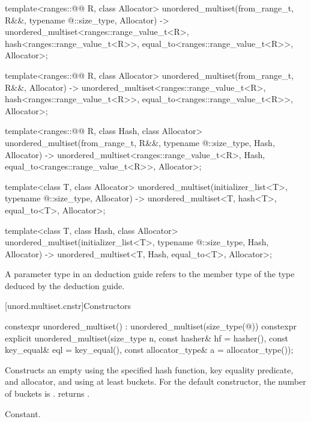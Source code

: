 \begin{codeblock}
{  template<ranges::@@ R, class Allocator>
    unordered_multiset(from_range_t, R&&, typename @\seebelow@::size_type, Allocator)
      -> unordered_multiset<ranges::range_value_t<R>, hash<ranges::range_value_t<R>>,
                            equal_to<ranges::range_value_t<R>>, Allocator>;

  template<ranges::@@ R, class Allocator>
    unordered_multiset(from_range_t, R&&, Allocator)
      -> unordered_multiset<ranges::range_value_t<R>, hash<ranges::range_value_t<R>>,
                            equal_to<ranges::range_value_t<R>>, Allocator>;

  template<ranges::@@ R, class Hash, class Allocator>
    unordered_multiset(from_range_t, R&&, typename @\seebelow@::size_type, Hash, Allocator)
      -> unordered_multiset<ranges::range_value_t<R>, Hash, equal_to<ranges::range_value_t<R>>,
                            Allocator>;

  template<class T, class Allocator>
    unordered_multiset(initializer_list<T>, typename @\seebelow@::size_type, Allocator)
      -> unordered_multiset<T, hash<T>, equal_to<T>, Allocator>;

  template<class T, class Hash, class Allocator>
    unordered_multiset(initializer_list<T>, typename @\seebelow@::size_type, Hash, Allocator)
      -> unordered_multiset<T, Hash, equal_to<T>, Allocator>;
}
\end{codeblock}

\pnum
A  parameter type in an  deduction guide
refers to the  member type of
the type deduced by the deduction guide.

[unord.multiset.cnstr]{Constructors}

%
\begin{itemdecl}
constexpr unordered_multiset() : unordered_multiset(size_type(@\seebelow@)) { }
constexpr explicit unordered_multiset(size_type n, const hasher& hf = hasher(),
                                      const key_equal& eql = key_equal(),
                                      const allocator_type& a = allocator_type());
\end{itemdecl}

\begin{itemdescr}
\pnum
\effects
Constructs an empty  using the
specified hash function, key equality predicate, and allocator, and
using at least  buckets.  For the default constructor,
the number of buckets is .
 returns .

\pnum
\complexity
Constant.
\end{itemdescr}

